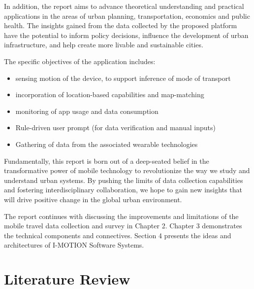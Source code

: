 \documentclass[12pt,two side]{report}
\begin{document}
In addition, the report aims to advance theoretical understanding and practical applications in the areas of urban planning, transportation, economics and public health. The insights gained from the data collected by the proposed platform have the potential to inform policy decisions, influence the development of urban infrastructure, and help create more livable and sustainable cities.\newline

The specific objectives of the application includes:
\begin{itemize}
  \item sensing motion of the device, to support inference of mode of transport
  \item incorporation of location-based capabilities and map-matching
  \item monitoring of app usage and data consumption
  \item Rule-driven user prompt (for data verification and manual inputs)
  \item Gathering of data from the associated wearable technologies
\end{itemize}
Fundamentally, this report is born out of a deep-seated belief in the transformative power of mobile technology to revolutionize the way we study and understand urban systems. By pushing the limits of data collection capabilities and fostering interdisciplinary collaboration, we hope to gain new insights that will drive positive change in the global urban environment.\newline

The report continues with discussing the improvements and limitations of the mobile travel data collection and survey in Chapter 2. Chapter 3 demonstrates the technical components and connectives. Section 4 presents the ideas and architectures of I-MOTION Software Systems.



\chapter{Literature Review}
\end{document}
